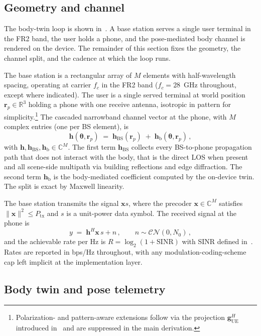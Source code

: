 \documentclass[journal,twocolumn,10pt]{IEEEtran}
\theoremstyle{plain}
\theoremstyle{definition}
\theoremstyle{remark}
\newcommand{\rr}{\mathbf{r}}
\newcommand{\xx}{\mathbf{x}}
\newcommand{\hh}{\bm{h}}
\newcommand{\thetab}{\bm{\theta}}
\newcommand{\hBS}{\bm{h}_{\mathrm{BS}}}
\newcommand{\hbody}{\bm{h}_{\mathrm{b}}}
\newcommand{\Complex}{\mathbb{C}}
\newcommand{\Reals}{\mathbb{R}}
\begin{document}
\subsection{Geometry and channel}

The body-twin loop is shown in~. A base
station serves a single user terminal in the FR2 band, the user
holds a phone, and the pose-mediated body channel is rendered on
the device. The remainder of this section fixes the geometry, the
channel split, and the cadence at which the loop runs.

The base station is a rectangular array of $M$ elements with
half-wavelength spacing, operating at carrier $f_c$ in the FR2 band
($f_c = 28$~GHz throughout, except where indicated). The user is a
single served terminal at world position $\rr_p \in \Reals^{3}$
holding a phone with one receive antenna, isotropic in pattern for
simplicity.\footnote{Polarization- and pattern-aware extensions
follow via the projection $\bm{g}_{\mathrm{UE}}^{H}$ introduced
in~ and are suppressed in the main derivation.}
The cascaded narrowband channel vector at the phone, with $M$
complex entries (one per BS element), is
\begin{equation}\label{eq:cascaded}
\hh(\thetab,\rr_p) \;=\; \hBS(\rr_p) \;+\; \hbody(\thetab,\rr_p) \,,
\end{equation}
with $\hh,\hBS,\hbody \in \Complex^{M}$. The first term $\hBS$
collects every BS-to-phone propagation path that does not interact
with the body, that is the direct LOS when present and all
scene-side multipath via building reflections and edge diffraction.
The second term $\hbody$ is the body-mediated coefficient computed
by the on-device twin. The split is exact by Maxwell linearity.

The base station transmits the signal $\xx s$, where the precoder
$\xx \in \Complex^{M}$ satisfies $\|\xx\|^{2} \leq P_{\mathrm{tx}}$
and $s$ is a unit-power data symbol. The received signal at the
phone is
\begin{equation}\label{eq:rx}
y \;=\; \hh^{H} \xx \, s + n \,, \qquad n \sim \mathcal{CN}(0, N_{0}) \,,
\end{equation}
and the achievable rate per Hz is $R = \log_{2}(1 + \mathrm{SINR})$
with SINR defined in~. Rates are reported in
bps/Hz throughout, with any modulation-coding-scheme cap left
implicit at the implementation layer.

\subsection{Body twin and pose telemetry}
\end{document}
